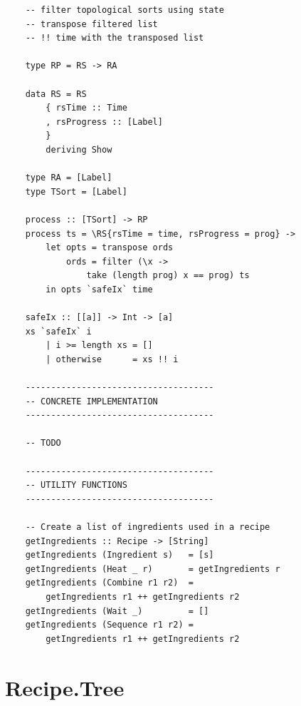 \documentclass[11pt]{article}
\begin{document}
\begin{tt}
\begin{lstlisting}
    -- filter topological sorts using state
    -- transpose filtered list 
    -- !! time with the transposed list

    type RP = RS -> RA

    data RS = RS
        { rsTime :: Time
        , rsProgress :: [Label]
        }
        deriving Show
        
    type RA = [Label]
    type TSort = [Label]

    process :: [TSort] -> RP
    process ts = \RS{rsTime = time, rsProgress = prog} ->
        let opts = transpose ords
            ords = filter (\x ->
                take (length prog) x == prog) ts
        in opts `safeIx` time

    safeIx :: [[a]] -> Int -> [a]
    xs `safeIx` i
        | i >= length xs = []
        | otherwise      = xs !! i
    
    -------------------------------------
    -- CONCRETE IMPLEMENTATION
    -------------------------------------
    
    -- TODO
    
    -------------------------------------
    -- UTILITY FUNCTIONS
    -------------------------------------
    
    -- Create a list of ingredients used in a recipe
    getIngredients :: Recipe -> [String]
    getIngredients (Ingredient s)   = [s]
    getIngredients (Heat _ r)       = getIngredients r
    getIngredients (Combine r1 r2)  =
        getIngredients r1 ++ getIngredients r2
    getIngredients (Wait _)         = []
    getIngredients (Sequence r1 r2) =
        getIngredients r1 ++ getIngredients r2
    \end{lstlisting}
    \end{tt}

    \section{Recipe.Tree}
\end{document}
